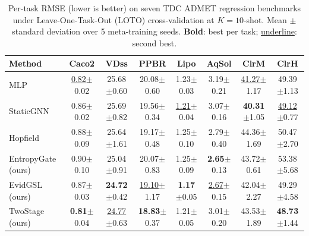\begin{table}[t]
\centering
\small
\caption{Per-task RMSE (lower is better) on seven TDC ADMET regression benchmarks under Leave-One-Task-Out (LOTO) cross-validation at $K=10$-shot. Mean $\pm$ standard deviation over 5 meta-training seeds. \textbf{Bold}: best per task; \underline{underline}: second best.}
\label{tab:main_k10}
\begin{tabular}{lccccccc}
\toprule
Method & Caco2 & VDss & PPBR & Lipo & AqSol & ClrM & ClrH \\
\midrule
MLP & \underline{0.82}$\pm$0.02 & 25.68$\pm$0.60 & 20.08$\pm$0.60 & 1.23$\pm$0.03 & 3.19$\pm$0.21 & \underline{41.27}$\pm$1.17 & 49.39$\pm$1.13 \\
StaticGNN & 0.86$\pm$0.02 & 25.69$\pm$0.82 & 19.56$\pm$0.34 & \underline{1.21}$\pm$0.04 & 3.07$\pm$0.16 & \textbf{40.31}$\pm$1.05 & \underline{49.12}$\pm$0.77 \\
Hopfield & 0.88$\pm$0.09 & 25.64$\pm$1.61 & 19.17$\pm$0.48 & 1.25$\pm$0.10 & 2.79$\pm$0.40 & 44.36$\pm$1.69 & 50.47$\pm$2.70 \\
\midrule
EntropyGate (ours) & 0.90$\pm$0.10 & 25.04$\pm$0.91 & 20.07$\pm$0.83 & 1.25$\pm$0.09 & \textbf{2.65}$\pm$0.13 & 43.72$\pm$0.61 & 53.38$\pm$5.68 \\
EvidGSL (ours) & 0.87$\pm$0.03 & \textbf{24.72}$\pm$0.42 & \underline{19.10}$\pm$1.17 & \textbf{1.17}$\pm$0.05 & \underline{2.67}$\pm$0.15 & 42.04$\pm$2.27 & 49.29$\pm$4.58 \\
TwoStage (ours) & \textbf{0.81}$\pm$0.04 & \underline{24.77}$\pm$0.63 & \textbf{18.83}$\pm$0.37 & 1.21$\pm$0.05 & 3.01$\pm$0.20 & 43.53$\pm$1.89 & \textbf{48.73}$\pm$1.44 \\
\bottomrule
\end{tabular}
\end{table}

